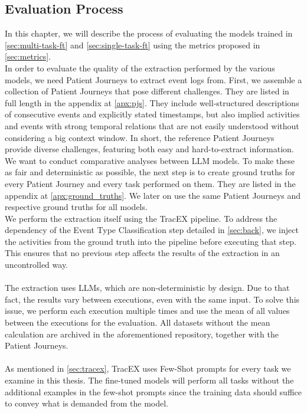 \subsection{Evaluation Process}\label{sec:eval_process}
In this chapter, we will describe the process of evaluating the models trained in \autoref{sec:multi-task-ft} and \autoref{sec:single-task-ft} using the metrics proposed in \autoref{sec:metrics}.\\
In order to evaluate the quality of the extraction performed by the various models, we need Patient Journeys to extract event logs from. First, we assemble a collection of Patient Journeys that pose different challenges. They are listed in full length in the appendix at \ref{apx:pjs}. They include well-structured descriptions of consecutive events and explicitly stated timestamps, but also implied activities and events with strong temporal relations that are not easily understood without considering a big context window. In short, the reference Patient Journeys provide diverse challenges, featuring both easy and hard-to-extract information.\\
We want to conduct comparative analyses between LLM models. To make these as fair and deterministic as possible, the next step is to create ground truths for every Patient Journey and every task performed on them. They are listed in the appendix at \ref{apx:ground_truths}. We later on use the same Patient Journeys and respective ground truths for all models.\\
We perform the extraction itself using the TracEX pipeline. To address the dependency of the Event Type Classification step detailed in \autoref{sec:back}, we inject the activities from the ground truth into the pipeline before executing that step. This ensures that no previous step affects the results of the extraction in an uncontrolled way.\\\\
The extraction uses LLMs, which are non-deterministic by design. Due to that fact, the results vary between executions, even with the same input. To solve this issue, we perform each execution multiple times and use the mean of all values between the executions for the evaluation. All datasets without the mean calculation are archived in the aforementioned repository, together with the Patient Journeys.\\\\
As mentioned in \autoref{sec:tracex}, TracEX uses Few-Shot prompts for every task we examine in this thesis. The fine-tuned models will perform all tasks without the additional examples in the few-shot prompts since the training data should suffice to convey what is demanded from the model.\\


